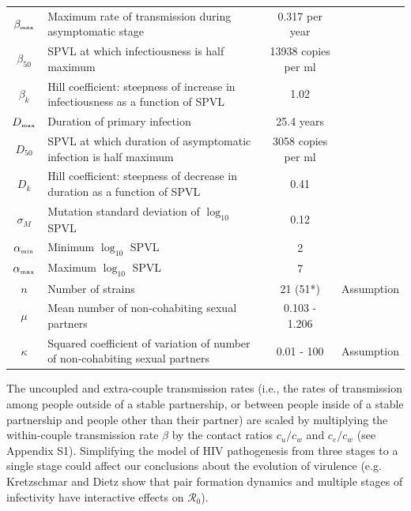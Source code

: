 \documentclass[10pt,letterpaper]{article}
\newcommand{\rzero}{{\mathcal R}_0}
\newcommand{\tsub}[2]{#1_{{\textrm{\tiny #2}}}}
\begin{document}
\begin{table}[h!]
\begin{tabular}{c p{2in} c l}
$\tsub{\beta}{max}$ & Maximum rate of transmission during asymptomatic stage & 0.317 per year & \cite{shirreff_transmission_2011} \\
$\beta_{50}$ & SPVL at which infectiousness is half maximum & 13938 copies per ml & \cite{shirreff_transmission_2011} \\
$\beta_k$ & Hill coefficient: steepness of increase in infectiousness as a function of SPVL & 1.02 & \cite{shirreff_transmission_2011} \\
$\tsub{D}{max}$ & Duration of primary infection & 25.4 years & \cite{shirreff_transmission_2011} \\
$D_{50}$ & SPVL at which duration of asymptomatic infection is half maximum & 3058 copies per ml & \cite{shirreff_transmission_2011} \\
$D_{k}$ & Hill coefficient: steepness of decrease in duration as a function of SPVL & 0.41 & \cite{shirreff_transmission_2011} \\
$\sigma_M$ & Mutation standard deviation of $\log_{10}$ SPVL & 0.12 & \cite{shirreff_transmission_2011} \\
$\tsub{\alpha}{min}$ & Minimum $\log_{10}$ SPVL & 2 & \cite{shirreff_transmission_2011}\\
$\tsub{\alpha}{max}$ & Maximum $\log_{10}$ SPVL & 7 & \cite{shirreff_transmission_2011}\\
$n$ & Number of strains & 21 (51*) & Assumption\\
$\mu$ & Mean number of non-cohabiting sexual partners & 0.103 - 1.206 & \cite{omori2015dynamics}\\
$\kappa$ & Squared coefficient of variation of number of non-cohabiting sexual partners & 0.01 - 100 & Assumption\\
\hline
\end{tabular}
\label{table:parmsTable}
\end{table}

The uncoupled and extra-couple transmission rates (i.e., the rates of
transmission among people outside of a stable partnership, or between
people inside of a stable partnership and people other than their
partner) are scaled by
multiplying the within-couple transmission rate $\beta$ by the contact
ratios $c_u/c_w$ and $c_e/c_w$ (see Appendix S1). Simplifying the model
of HIV pathogenesis from three stages to a single stage could affect
our conclusions about the evolution of virulence (e.g. Kretzschmar and
Dietz \cite{kretzschmar_effect_1998} show that pair formation dynamics
and multiple stages of infectivity have interactive effects on
$\rzero$). 
\end{document}
